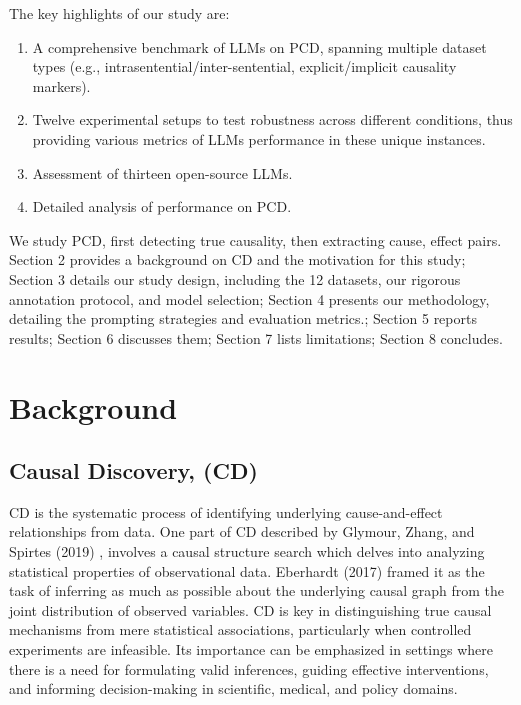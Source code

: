 \documentclass[conference]{IEEEtran}
\begin{document}
The key highlights of our study are:
\begin{enumerate}
    \item A comprehensive benchmark of LLMs on  PCD, spanning multiple dataset types (e.g., intrasentential/inter-sentential, explicit/implicit causality markers).
    \item Twelve experimental setups to test robustness across different conditions, thus providing various metrics of LLMs performance in these unique instances.
    \item Assessment of thirteen open-source LLMs.
    \item Detailed analysis of performance on PCD.
\end{enumerate}


We study PCD, first detecting true causality, then extracting cause, effect pairs. Section 2 provides a background on CD and the motivation for this study; Section 3 details our study design, including the 12 datasets, our rigorous annotation protocol, and model selection; Section 4 presents our methodology, detailing the prompting strategies and evaluation metrics.; Section 5 reports results; Section 6 discusses them; Section 7 lists limitations; Section 8 concludes. 


\section{Background}
\subsection{Causal Discovery, (CD)}

CD is the systematic process of identifying underlying cause-and-effect relationships from data. One part of CD described by Glymour, Zhang, and Spirtes (2019) \cite{glymour2019review}, involves a causal structure search which delves into analyzing statistical properties of observational data. Eberhardt (2017) \cite{eberhardt2017introduction} framed it as the task of inferring as much as possible about the underlying causal graph from the joint distribution of observed variables. CD is key in distinguishing true causal mechanisms from mere statistical associations, particularly when controlled experiments are infeasible. Its importance can be emphasized in settings where there is a need for formulating valid inferences, guiding effective interventions, and informing decision-making in scientific, medical, and policy domains.
\end{document}
